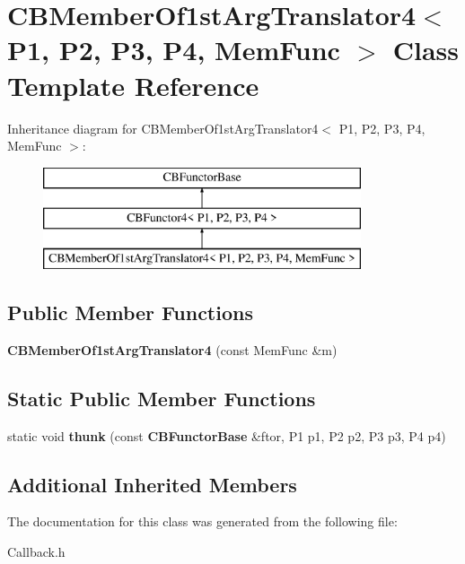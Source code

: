 \section{C\+B\+Member\+Of1st\+Arg\+Translator4$<$ P1, P2, P3, P4, Mem\+Func $>$ Class Template Reference}
\label{classCBMemberOf1stArgTranslator4}
Inheritance diagram for C\+B\+Member\+Of1st\+Arg\+Translator4$<$ P1, P2, P3, P4, Mem\+Func $>$\+:\begin{figure}[H]
\begin{center}
\leavevmode
\includegraphics[height=3.000000cm]{classCBMemberOf1stArgTranslator4}
\end{center}
\end{figure}
\subsection*{Public Member Functions}
\begin{DoxyCompactItemize}
\item 
{\bfseries C\+B\+Member\+Of1st\+Arg\+Translator4} (const Mem\+Func \&m)\label{classCBMemberOf1stArgTranslator4_aaa496d239ea6144915739368a8007e3b}

\end{DoxyCompactItemize}
\subsection*{Static Public Member Functions}
\begin{DoxyCompactItemize}
\item 
static void {\bfseries thunk} (const {\bf C\+B\+Functor\+Base} \&ftor, P1 p1, P2 p2, P3 p3, P4 p4)\label{classCBMemberOf1stArgTranslator4_a6403ce84fe0adc0ffbd602c8d697a8b1}

\end{DoxyCompactItemize}
\subsection*{Additional Inherited Members}


The documentation for this class was generated from the following file\+:\begin{DoxyCompactItemize}
\item 
Callback.\+h\end{DoxyCompactItemize}
